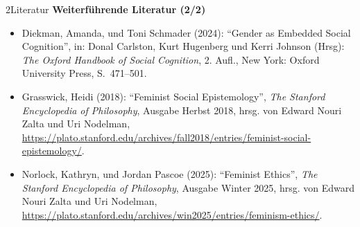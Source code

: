 \documentclass[xcolor=table,9pt,aspectratio=169]{beamer}
\begin{document}
\begin{frame}{\vspace*{10mm}2\hspace*{1em}Literatur}
\textbf{Weiterführende Literatur (2/2)}
{\footnotesize
\begin{itemize}[label=,leftmargin=2em,itemindent=-2em]
   \item Diekman, Amanda, und Toni Schmader (2024): \enquote{Gender as Embedded Social Cognition}, in: Donal Carlston, Kurt Hugenberg und Kerri Johnson (Hrsg): \textit{The Oxford Handbook of Social Cognition}, 2. Aufl., New York: Oxford University Press, S.~471--501.
   \item Grasswick, Heidi (2018): \enquote{Feminist Social Epistemology}, \textit{The Stanford Encyclopedia of Philosophy}, Ausgabe Herbst 2018, hrsg. von Edward Nouri Zalta und Uri Nodelman, \url{https://plato.stanford.edu/archives/fall2018/entries/feminist-social-epistemology/}.
   \item Norlock, Kathryn, und Jordan Pascoe (2025): \enquote{Feminist Ethics}, \textit{The Stanford Encyclopedia of Philosophy}, Ausgabe Winter 2025, hrsg. von Edward Nouri Zalta und Uri Nodelman, \url{https://plato.stanford.edu/archives/win2025/entries/feminism-ethics/}.
\end{itemize}
}
\end{frame}
\end{document}
